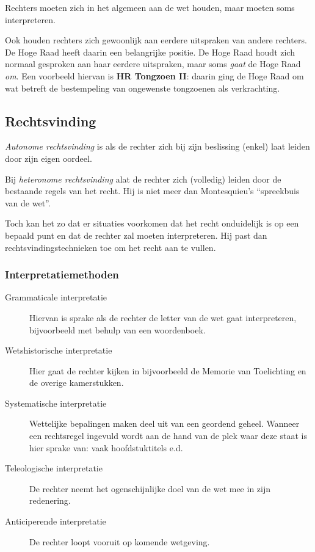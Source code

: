 \documentclass{article}
\begin{document}
Rechters moeten zich in het algemeen aan de wet houden, maar moeten soms
interpreteren.

Ook houden rechters zich gewoonlijk aan eerdere uitspraken van andere rechters.
De Hoge Raad heeft daarin een belangrijke positie. De Hoge Raad houdt zich
normaal gesproken aan haar eerdere uitspraken, maar soms \emph{gaat} de Hoge
Raad \emph{om}. Een voorbeeld hiervan is \textbf{HR Tongzoen II}: daarin ging
de Hoge Raad om wat betreft de bestempeling van ongewenste tongzoenen als
verkrachting.

\subsection{Rechtsvinding}

\emph{Autonome rechtsvinding} is als de rechter zich bij zijn beslissing
(enkel) laat leiden door zijn eigen oordeel.

Bij \emph{heteronome rechtsvinding} alat de rechter zich (volledig) leiden door
de bestaande regels van het recht. Hij is niet meer dan Montesquieu's
``spreekbuis van de wet''.

Toch kan het zo dat er situaties voorkomen dat het recht onduidelijk is op een
bepaald punt en dat de rechter zal moeten interpreteren. Hij past dan
rechtsvindingstechnieken toe om het recht aan te vullen.

\subsubsection{Interpretatiemethoden} \begin{description} \item[Grammaticale
interpretatie] Hiervan is sprake als de rechter de letter van de wet gaat
interpreteren, bijvoorbeeld met behulp van een woordenboek.
\item[Wetshistorische interpretatie] Hier gaat de rechter kijken in
  bijvoorbeeld de Memorie van Toelichting en de overige kamerstukken.
\item[Systematische interpretatie] Wettelijke bepalingen maken deel uit van een
  geordend geheel. Wanneer een rechtsregel ingevuld wordt aan de hand van de
  plek waar deze staat is hier sprake van: vaak hoofdstuktitels e.d.
\item[Teleologische interpretatie] De rechter neemt het ogenschijnlijke doel
van de wet mee in zijn redenering. \item[Anticiperende interpretatie] De
  rechter loopt vooruit op komende wetgeving. \end{description}
\end{document}
